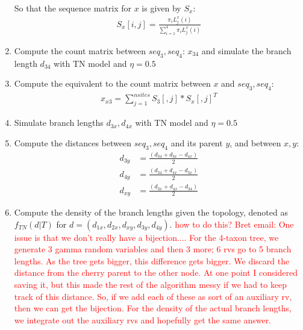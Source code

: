 \documentclass[12pt,letterpaper]{article}
\newcommand{\falta}[1]{\textcolor{red}{#1}}
\begin{document}
\begin{enumerate}
So that the sequence matrix for $x$ is given by $S_x$:
\begin{align*}
S_x[i,j] = \frac{\pi_i L^x_j(i)}{\sum_{i=1}^4 \pi_i L^x_j(i)}
\end{align*}

\item Compute the count matrix between $seq_3,seq_4$: $x_{34}$ and
  simulate the branch length $d_{34}$ with TN model and
  $\eta=0.5$
\item Compute the equivalent to the count matrix between $x$ and
  $seq_3,seq_4$:
\begin{align*}
x_{x3}=\sum_{j=1}^{nsites} S_3[,j]*S_x[,j]^T
\end{align*}
\item Simulate branch lengths $d_{3x}, d_{4x}$ with TN model
  and $\eta=0.5$
\item Compute the distances between $seq_3,seq_4$ and its parent $y$,
  and between $x,y$:
\begin{align*}
  d_{3y} &= \frac{(d_{34}+d_{3x}-d_{4x})}{2} \\
  d_{4y} &= \frac{(d_{34}+d_{4x}-d_{3x})}{2} \\
  d_{xy} &= \frac{(d_{3x}+d_{4x}-d_{34})}{2}
\end{align*}

\item Compute the density of the branch lengths given the topology,
  denoted as $f_{TN}(d|T)$ for
  $d=(d_{1x},d_{2x},d_{xy},d_{3y},d_{4y})$. \falta{how to do this?
    Bret email: One issue is that we don't really have a
    bijection.... For the 4-taxon tree, we generate 3 gamma random
    variables and then 3 more; 6 rvs go to 5 branch lengths. As the
    tree gets bigger, this difference gets bigger. We discard the
    distance from the cherry parent to the other node. At one point I
    considered saving it, but this made the rest of the algorithm
    messy if we had to keep track of this distance. So, if we add each
    of these as sort of an auxiliary rv, then we can get the
    bijection. For the density of the actual branch lengths, we
    integrate out the auxiliary rvs and hopefully get the same
    answer.}
\end{enumerate}
\end{document}
